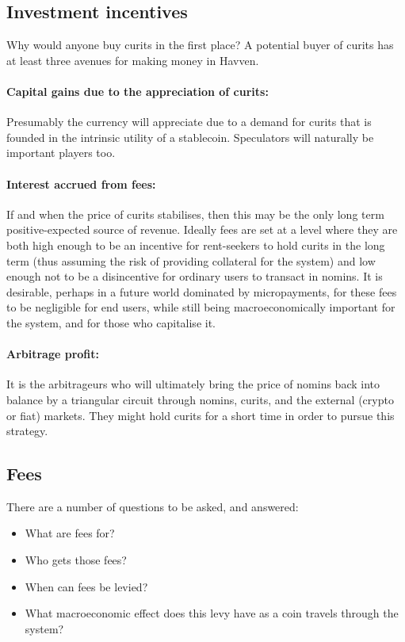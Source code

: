 \documentclass{article}
\begin{document}
\pagebreak
\subsection{Investment incentives}
Why would anyone buy curits in the first place? A potential buyer of curits has at least three avenues for making
money in Havven.

\paragraph{Capital gains due to the appreciation of curits:}
Presumably the currency will appreciate due to a demand for curits that is founded in the intrinsic
utility of a stablecoin. Speculators will naturally be important players too.

\paragraph{Interest accrued from fees:}
If and when the price of curits stabilises, then this may be the only long term positive-expected
source of revenue. Ideally fees are set at a level where they are both high enough to be an incentive
for rent-seekers to hold curits in the long term (thus assuming the risk of providing collateral for
the system) and low enough not to be a disincentive for ordinary users to transact in nomins.
It is desirable, perhaps in a future world dominated by micropayments, for these fees to be
negligible for end users, while still being macroeconomically important for the system, and for those
who capitalise it.

\paragraph{Arbitrage profit:}
It is the arbitrageurs who will ultimately bring the price of nomins back into balance by a triangular circuit
through nomins, curits, and the external (crypto or fiat) markets. They might hold curits for a short time in order
to pursue this strategy.


\pagebreak
\subsection{Fees}
There are a number of questions to be asked, and answered:
\begin{itemize}
    \item What are fees for?
    \item Who gets those fees?
    \item When can fees be levied?
    \item What macroeconomic effect does this levy have as a coin travels through the system?
\end{itemize}
\end{document}
